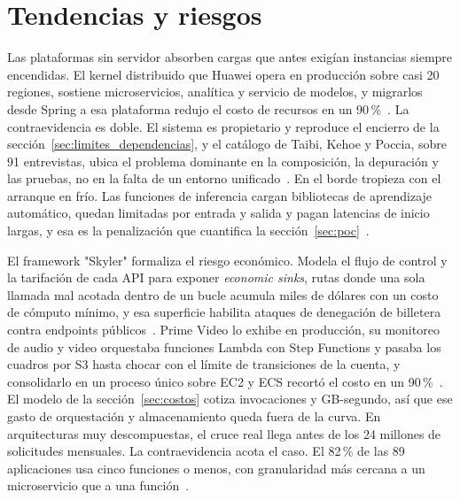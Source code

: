 \documentclass[12pt, letterpaper, table, xcdraw]{inf-pucv}
\begin{document}

\section{Tendencias y riesgos}
\label{sec:riesgos}

Las plataformas sin servidor absorben cargas que antes exigían instancias siempre encendidas. El kernel distribuido que Huawei opera en producción sobre casi 20 regiones, sostiene microservicios, analítica y servicio de modelos, y migrarlos desde Spring a esa plataforma redujo el costo de recursos en un 90\,\%~\parencite{chen2024yuanrong}. La contraevidencia es doble. El sistema es propietario y reproduce el encierro de la sección~\ref{sec:limites_dependencias}, y el catálogo de Taibi, Kehoe y Poccia, sobre 91 entrevistas, ubica el problema dominante en la composición, la depuración y las pruebas, no en la falta de un entorno unificado~\parencite{taibi2022badpractices}. En el borde tropieza con el arranque en frío. Las funciones de inferencia cargan bibliotecas de aprendizaje automático, quedan limitadas por entrada y salida y pagan latencias de inicio largas, y esa es la penalización que cuantifica la sección~\ref{sec:poc}~\parencite{xie2021}.

El framework "Skyler" formaliza el riesgo económico. Modela el flujo de control y la tarifación de cada API para exponer \emph{economic sinks}, rutas donde una sola llamada mal acotada dentro de un bucle acumula miles de dólares con un costo de cómputo mínimo, y esa superficie habilita ataques de denegación de billetera contra endpoints públicos~\parencite{ribeiro2026skyler}. Prime Video lo exhibe en producción, su monitoreo de audio y video orquestaba funciones Lambda con Step Functions y pasaba los cuadros por S3 hasta chocar con el límite de transiciones de la cuenta, y consolidarlo en un proceso único sobre EC2 y ECS recortó el costo en un 90\,\%~\parencite{gancarz2023infoq}. El modelo de la sección~\ref{sec:costos} cotiza invocaciones y GB-segundo, así que ese gasto de orquestación y almacenamiento queda fuera de la curva. En arquitecturas muy descompuestas, el cruce real llega antes de los 24 millones de solicitudes mensuales. La contraevidencia acota el caso. El 82\,\% de las 89 aplicaciones usa cinco funciones o menos, con granularidad más cercana a un microservicio que a una función~\parencite{eismann2021}.
\end{document}
